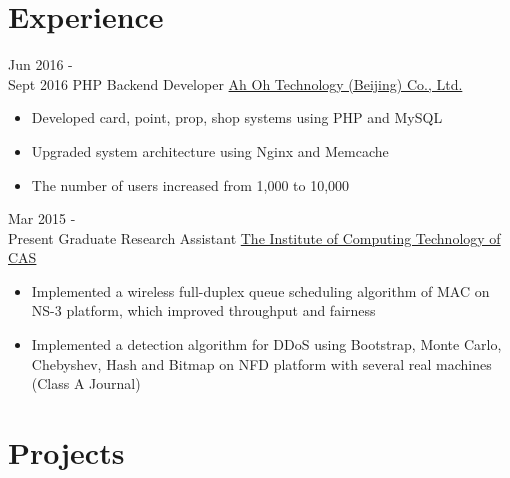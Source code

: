 \documentclass[letterpaper]{twentysecondcv} %
\begin{document}
\makeprofile %



\section{Experience}

\begin{twenty} %
	\twentyitem
    	{Jun 2016 - \\Sept 2016}
        {PHP Backend Developer}
        {\href{http://www.runorout.cn/}{Ah Oh Technology (Beijing) Co., Ltd.}}
        {}
        {
        {\begin{itemize}
        \item Developed card, point, prop, shop systems using PHP and MySQL
        \item Upgraded system architecture using Nginx and Memcache
        \item The number of users increased from 1,000 to 10,000
    \end{itemize}}
        }
    
    \twentyitem
	    {Mar 2015 - \\Present}
	    {Graduate Research Assistant}
	    {\href{http://english.ict.cas.cn/}{ The Institute of Computing Technology of CAS}}
	    {}
	    {
    	{\begin{itemize}
    			\item Implemented a wireless full-duplex queue scheduling algorithm of MAC on NS-3 platform, which improved throughput and fairness
    			\item Implemented a detection algorithm for DDoS using Bootstrap, Monte Carlo, Chebyshev, Hash and Bitmap on NFD platform with several real machines (Class A Journal)
    	\end{itemize}}
    }
        
\end{twenty}


\section{Projects}
\end{document}
